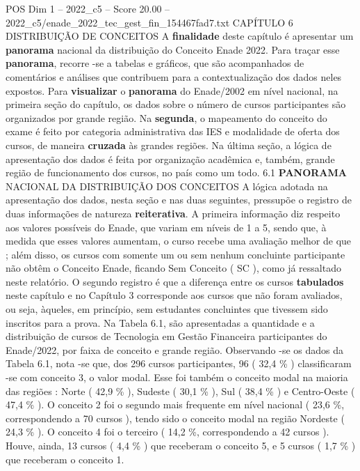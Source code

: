\begin{textsample}{POS Dim 1 – 2022\_c5 – Score 20.00 – 2022\_c5/enade\_2022\_tec\_gest\_fin\_154467fad7.txt}  \label{ex:f1_pos_023}
CAPÍTULO 6 DISTRIBUIÇÃO DE CONCEITOS A \textbf{finalidade} deste capítulo é apresentar um \textbf{panorama} nacional da distribuição do Conceito Enade 2022.
Para traçar esse \textbf{panorama}, recorre -se a tabelas e gráficos, que são acompanhados de comentários e análises que contribuem para a contextualização dos dados neles expostos.
Para \textbf{visualizar} o \textbf{panorama} do Enade/2002 em nível nacional, na primeira seção do capítulo, os dados sobre o número de cursos participantes são organizados por grande região.
Na \textbf{segunda}, o mapeamento do conceito do exame é feito por categoria administrativa das IES e modalidade de oferta dos cursos, de maneira \textbf{cruzada} às grandes regiões.
Na última seção, a lógica de apresentação dos dados é feita por organização acadêmica e, também, grande região de funcionamento dos cursos, no país como um todo. 6.1 \textbf{PANORAMA} NACIONAL DA DISTRIBUIÇÃO DOS CONCEITOS A lógica adotada na apresentação dos dados, nesta seção e nas duas seguintes, pressupõe o registro de duas informações de natureza \textbf{reiterativa}.
A primeira informação diz respeito aos valores possíveis do Enade, que variam em níveis de 1 a 5, sendo que, à medida que esses valores aumentam, o curso recebe uma avaliação melhor de que ; além disso, os cursos com somente um ou sem nenhum concluinte participante não obtêm o Conceito Enade, ficando Sem Conceito ( SC ), como já ressaltado neste relatório.
O segundo registro é que a diferença entre os cursos \textbf{tabulados} neste capítulo e no Capítulo 3 corresponde aos cursos que não foram avaliados, ou seja, àqueles, em princípio, sem estudantes concluintes que tivessem sido inscritos para a prova.
Na Tabela 6.1, são apresentadas a quantidade e a distribuição de cursos de Tecnologia em Gestão Financeira participantes do Enade/2022, por faixa de conceito e grande região.
Observando -se os dados da Tabela 6.1, nota -se que, dos 296 cursos participantes, 96 ( 32,4 \% ) classificaram -se com conceito 3, o valor modal.
Esse foi também o conceito modal na maioria das regiões : Norte ( 42,9 \% ), Sudeste ( 30,1 \% ), Sul ( 38,4 \% ) e Centro-Oeste ( 47,4 \% ).
O conceito 2 foi o segundo mais frequente em nível nacional ( 23,6 \%, correspondendo a 70 cursos ), tendo sido o conceito modal na região Nordeste ( 24,3 \% ).
O conceito 4 foi o terceiro ( 14,2 \%, correspondendo a 42 cursos ).
Houve, ainda, 13 cursos ( 4,4 \% ) que receberam o conceito 5, e 5 cursos ( 1,7 \% ) que receberam o conceito 1.

\end{textsample}
